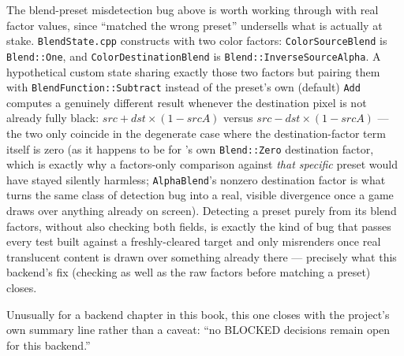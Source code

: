 The blend-preset misdetection bug above is worth working through with real factor values,
since ``matched the wrong preset'' undersells what is actually at stake.
\texttt{BlendState.cpp} constructs  with two color factors:
\texttt{ColorSourceBlend} is \texttt{Blend::One}, and \texttt{ColorDestinationBlend} is
\texttt{Blend::InverseSourceAlpha}. A hypothetical custom state sharing exactly those two
factors but pairing them with
\texttt{BlendFunction::Subtract} instead of the preset's own (default) \texttt{Add} computes a
genuinely different result whenever the destination pixel is not already fully black:
$\mathit{src} + \mathit{dst} \times (1 - \mathit{srcA})$ versus
$\mathit{src} - \mathit{dst} \times (1 - \mathit{srcA})$ --- the two only coincide in the
degenerate case where the destination-factor term itself is zero (as it happens to be for
's own \texttt{Blend::Zero} destination factor, which is exactly
why a factors-only comparison against \emph{that specific} preset would have stayed silently
harmless; \texttt{AlphaBlend}'s nonzero destination factor is what turns the same class of
detection bug into a real, visible divergence once a game draws over anything already on
screen). Detecting a preset purely from its blend factors, without also checking both
 fields, is exactly the kind of bug that passes every test built
against a freshly-cleared target and only misrenders once real translucent content is drawn
over something already there --- precisely what this backend's fix (checking
 as well as the raw factors before matching a preset) closes.

Unusually for a backend chapter in this book, this one closes with the project's own summary
line rather than a caveat: ``no BLOCKED decisions remain open for this backend.''
